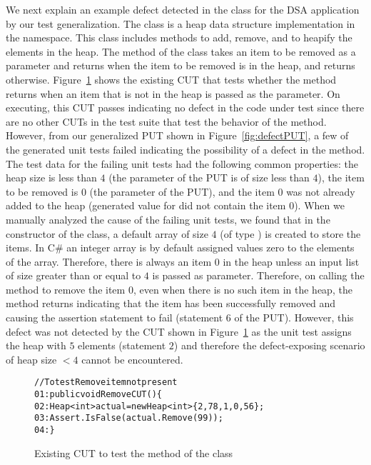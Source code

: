 We next explain an example defect detected in the  class for the DSA application by our test generalization. The  class is a heap data structure implementation in the  namespace. This class includes methods to add, remove, and to heapify the elements in the heap. The  method of the class takes an item to be removed as a parameter and returns  when the item to be removed is in the heap, and returns  otherwise. Figure~\ref{fig:defectCUT} shows the existing CUT that tests whether the  method returns  when an item that is not in the heap is passed as the parameter. On executing, this CUT passes indicating no defect in the code under test since there are no other CUTs in the test suite that test the behavior of the method. However, from our generalized PUT shown in Figure~\ref{fig:defectPUT}, a few of the generated unit tests failed indicating the possibility of a defect in the  method. The test data for the failing unit tests had the following common properties: the heap size is less than $4$ (the  parameter of the PUT is of size less than $4$), the item to be removed is $0$ (the  parameter of the PUT), and the item $0$ was not already added to the heap (generated value for  did not contain the item $0$). When we manually analyzed the cause of the failing unit tests, we found that in the constructor of the  class, a default array of size $4$ (of type ) is created to store the items. In C\# an integer array is by default assigned values zero to the elements of the array. Therefore, there is always an item $0$ in the heap unless an input list of size greater than or equal to $4$ is passed as parameter. Therefore, on calling the  method to remove the item $0$, even when there is no such item in the heap, the method returns  indicating that the item has been successfully removed and causing the assertion statement to fail (statement $6$ of the PUT). However, this defect was not detected by the CUT shown in Figure~\ref{fig:defectCUT} as the unit test assigns the heap with $5$ elements (statement $2$) and therefore the defect-exposing scenario of heap size $< 4$ cannot be encountered. 

\begin{figure}[t]
\begin{CodeOut}
\begin{alltt}
//To test Remove item not present
01: public void RemoveCUT()\{
02: \hspace*{0.07in}Heap<int> actual = new Heap<int> \{2, 78, 1, 0, 56\};
03: \hspace*{0.07in}Assert.IsFalse(actual.Remove(99));
04: \hspace*{0.02in}\}
\end{alltt}
\end{CodeOut}
\caption{Existing CUT to test the  method of the  class}
\label{fig:defectCUT}
\end{figure}


